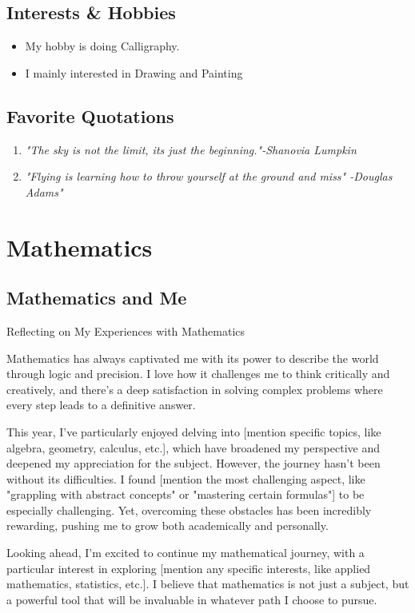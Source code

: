 \documentclass{article}
\begin{document}
\subsection{Interests \& Hobbies}
\begin{itemize}
    \item My hobby is doing Calligraphy.
    \item I mainly interested in Drawing and Painting
   
\end{itemize}

\subsection{Favorite Quotations}
\begin{enumerate}
    \item \textit{ "The sky is not the limit, its just the beginning."-Shanovia Lumpkin}
    \item \textit{"Flying is learning how to throw yourself at the ground and miss" -Douglas Adams"}
\end{enumerate}

\section{Mathematics}

\subsection{Mathematics and Me}
Reflecting on My Experiences with Mathematics

Mathematics has always captivated me with its power to describe the world through logic and precision. I love how it challenges me to think critically and creatively, and there’s a deep satisfaction in solving complex problems where every step leads to a definitive answer.

This year, I’ve particularly enjoyed delving into [mention specific topics, like algebra, geometry, calculus, etc.], which have broadened my perspective and deepened my appreciation for the subject. However, the journey hasn’t been without its difficulties. I found [mention the most challenging aspect, like "grappling with abstract concepts" or "mastering certain formulas"] to be especially challenging. Yet, overcoming these obstacles has been incredibly rewarding, pushing me to grow both academically and personally.

Looking ahead, I’m excited to continue my mathematical journey, with a particular interest in exploring [mention any specific interests, like applied mathematics, statistics, etc.]. I believe that mathematics is not just a subject, but a powerful tool that will be invaluable in whatever path I choose to pursue.
\end{document}
